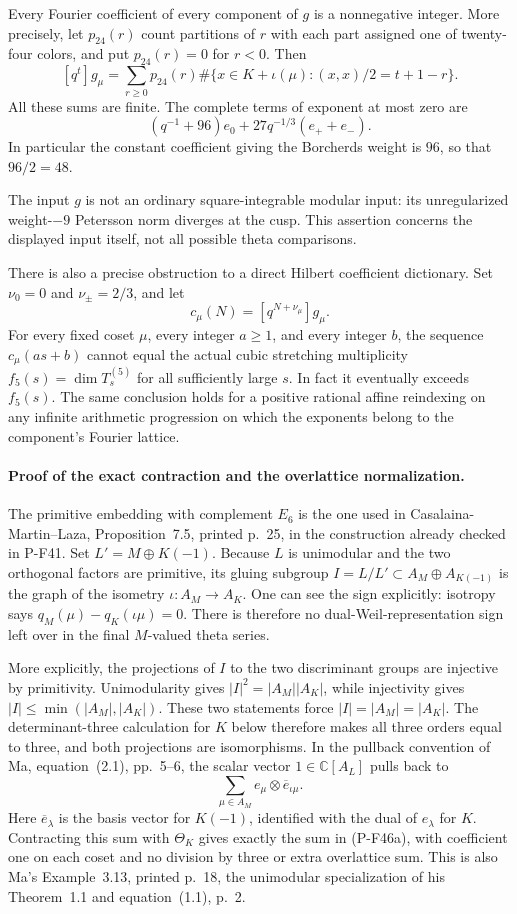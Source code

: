 \documentclass[11pt,a4paper]{article}
\begin{document}
Every Fourier coefficient of every component of $g$ is
a nonnegative integer. More precisely, let $p_{24}(r)$
count partitions of $r$ with each part assigned one of
twenty-four colors, and put $p_{24}(r)=0$ for $r<0$.
Then
\[
 [q^t]g_\mu
   =\sum_{r\ge0}p_{24}(r)
       \#\{x\in K+\iota(\mu):(x,x)/2=t+1-r\}.
 \tag{P-F46c}
\]
All these sums are finite. The complete terms of exponent
at most zero are
\[
        (q^{-1}+96)e_0
                   +27q^{-1/3}(e_++e_-).
 \tag{P-F46d}
\]
In particular the constant coefficient giving the
Borcherds weight is $96$, so that $96/2=48$.

The input $g$ is not an ordinary square-integrable modular
input: its unregularized weight-$-9$ Petersson norm
diverges at the cusp. This assertion concerns the displayed
input itself, not all possible theta comparisons.

There is also a precise obstruction to a direct Hilbert
coefficient dictionary. Set $\nu_0=0$ and
$\nu_\pm=2/3$, and let
\[
                  c_\mu(N)=[q^{N+\nu_\mu}]g_\mu.
\]
For every fixed coset $\mu$, every integer $a\ge1$,
and every integer $b$, the sequence $c_\mu(as+b)$
cannot equal the actual cubic stretching multiplicity
$f_5(s)=\dim T^{(5)}_s$ for all sufficiently large $s$.
In fact it eventually exceeds $f_5(s)$. The same conclusion
holds for a positive rational affine reindexing on any
infinite arithmetic progression on which the exponents
belong to the component's Fourier lattice.

\paragraph{Proof of the exact contraction and the overlattice normalization.}
The primitive embedding with complement $E_6$ is the one
used in Casalaina-Martin--Laza, Proposition~7.5, printed
p.~25, in the construction already checked in P-F41.
Set $L'=M\oplus K(-1)$. Because $L$ is unimodular and
the two orthogonal factors are primitive, its gluing
subgroup
$I=L/L'\subset A_M\oplus A_{K(-1)}$
is the graph of the isometry $\iota:A_M\to A_K$.
One can see the sign explicitly: isotropy says
$q_M(\mu)-q_K(\iota\mu)=0$. There is therefore no
dual-Weil-representation sign left over in the final
$M$-valued theta series.

More explicitly, the projections of $I$ to the two
discriminant groups are injective by primitivity.
Unimodularity gives $|I|^2=|A_M||A_K|$, while
injectivity gives $|I|\le\min(|A_M|,|A_K|)$.
These two statements force $|I|=|A_M|=|A_K|$.
The determinant-three calculation for $K$ below
therefore makes all three orders equal to three,
and both projections are isomorphisms.
In the pullback convention of Ma, equation~(2.1),
pp.~5--6, the scalar vector $1\in\mathbb C[A_L]$
pulls back to
\[
                  \sum_{\mu\in A_M}
                      e_\mu\otimes\overline e_{\iota\mu}.
 \tag{P-F46e}
\]
Here $\overline e_\lambda$ is the basis vector for
$K(-1)$, identified with the dual of $e_\lambda$ for
$K$. Contracting this sum with $\Theta_K$ gives
exactly the sum in (P-F46a), with coefficient one
on each coset and no division by three or extra
overlattice sum. This is also Ma's Example~3.13,
printed p.~18, the unimodular specialization of
his Theorem~1.1 and equation~(1.1), p.~2.
\end{document}
